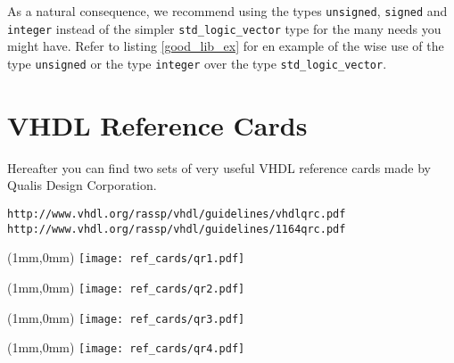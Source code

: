 As a natural consequence, we recommend using the types \texttt{unsigned}, \texttt{signed} and \texttt{integer} instead of the simpler \texttt{std\_logic\_vector} type for the many needs you might have. Refer to listing \ref{good_lib_ex} for en example of the wise use of the type \texttt{unsigned} or the type \texttt{integer} over the type \texttt{std\_logic\_vector}.

\chapter{VHDL Reference Cards}
Hereafter you can find two sets of very useful VHDL reference cards made by Qualis Design Corporation.

\begin{verbatim}
http://www.vhdl.org/rassp/vhdl/guidelines/vhdlqrc.pdf
http://www.vhdl.org/rassp/vhdl/guidelines/1164qrc.pdf
\end{verbatim}

\newpage\clearpage
\thispagestyle{empty}
\begin{textblock*}{174mm}(1mm,0mm)
\texttt{[image: ref\_cards/qr1.pdf]}
\end{textblock*}
\null\newpage

\thispagestyle{empty}
\begin{textblock*}{174mm}(1mm,0mm)
\texttt{[image: ref\_cards/qr2.pdf]}
\end{textblock*}
\null\newpage

\thispagestyle{empty}
\begin{textblock*}{174mm}(1mm,0mm)
\texttt{[image: ref\_cards/qr3.pdf]}
\end{textblock*}
\null\newpage

\thispagestyle{empty}
\begin{textblock*}{174mm}(1mm,0mm)
\texttt{[image: ref\_cards/qr4.pdf]}
\end{textblock*}
\null\newpage

